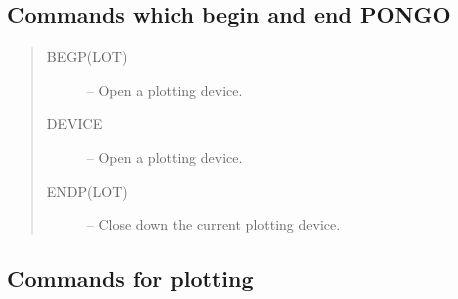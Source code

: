 \documentclass[twoside,11pt]{article}
\newcommand{\htmlref}[2]{#1}
\renewcommand{\_}{\texttt{\symbol{95}}}
\newcommand{\iref} [1]{\htmlref{#1}{#1}}
\newcommand{\iiref}[2]{\htmlref{#1}{#2}}
\begin{document}
\subsection{Commands which begin and end PONGO}

\small
\begin {quote}
  \begin {description}
  \item [\iiref{BEGP(LOT)}{BEGPLOT}] -- Open a plotting device.
  \item [\iref{DEVICE}] -- Open a plotting device.
  \item [\iiref{ENDP(LOT)}{ENDPLOT}] -- Close down the current plotting device.
  \end {description}
\end {quote}
\normalsize


\subsection{Commands for plotting}
\end{document}
